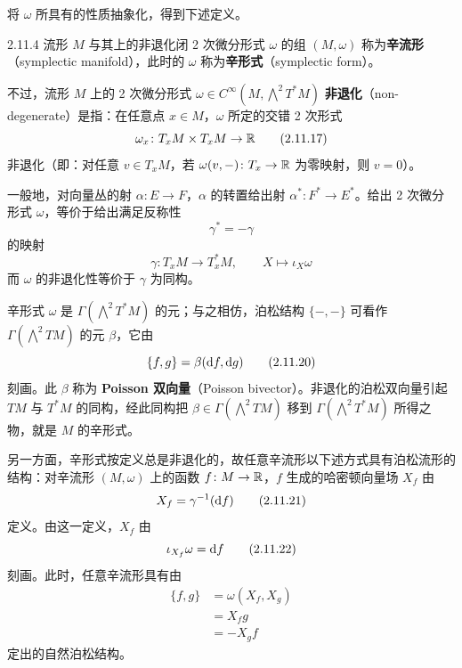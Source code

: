 
将 $\omega$ 所具有的性质抽象化，得到下述定义。

\begin{definition}{2.11.4}
流形 $M$ 与其上的非退化闭 2 次微分形式 $\omega$ 的组 $(M,\omega)$ 称为\textbf{辛流形}（symplectic manifold），此时的 $\omega$ 称为\textbf{辛形式}（symplectic form）。
\end{definition}

不过，流形 $M$ 上的 2 次微分形式 $\omega\in C^\infty(M,\bigwedge^2T^*M)$ \textbf{非退化}（non-degenerate）是指：在任意点 $x\in M$，$\omega$ 所定的交错 2 次形式
\begin{equation}
  \omega_x\colon T_xM\times T_xM\to\mathbb{R}
  \tag{2.11.17}
\end{equation}
非退化（即：对任意 $v\in T_xM$，若 $\omega(v,-)\colon T_x\to\mathbb{R}$ 为零映射，则 $v=0$）。


一般地，对向量丛的射 $\alpha\colon E\to F$，$\alpha$ 的转置给出射 $\alpha^*\colon F^*\to E^*$。给出 2 次微分形式 $\omega$，等价于给出满足反称性
\begin{equation}
  \gamma^* = -\gamma
  \tag{2.11.18}
\end{equation}
的映射
\begin{equation}
  \gamma\colon T_xM\to T_x^*M,\qquad X\mapsto\iota_X\omega
  \tag{2.11.19}
\end{equation}
而 $\omega$ 的非退化性等价于 $\gamma$ 为同构。

辛形式 $\omega$ 是 $\Gamma(\bigwedge^2T^*M)$ 的元；与之相仿，泊松结构 $\{-,-\}$ 可看作 $\Gamma(\bigwedge^2TM)$ 的元 $\beta$，它由
\begin{equation}
  \{f,g\} = \beta(\mathrm{d} f,\mathrm{d} g)
  \tag{2.11.20}
\end{equation}
刻画。此 $\beta$ 称为 \textbf{Poisson 双向量}（Poisson bivector）。非退化的泊松双向量引起 $TM$ 与 $T^*M$ 的同构，经此同构把 $\beta\in\Gamma(\bigwedge^2TM)$ 移到 $\Gamma(\bigwedge^2T^*M)$ 所得之物，就是 $M$ 的辛形式。

另一方面，辛形式按定义总是非退化的，故任意辛流形以下述方式具有泊松流形的结构：对辛流形 $(M,\omega)$ 上的函数 $f\colon M\to\mathbb{R}$，$f$ 生成的哈密顿向量场 $X_f$ 由
\begin{equation}
  X_f = \gamma^{-1}(\mathrm{d} f)
  \tag{2.11.21}
\end{equation}
定义。由这一定义，$X_f$ 由
\begin{equation}
  \iota_{X_f}\omega = \mathrm{d} f
  \tag{2.11.22}
\end{equation}
刻画。此时，任意辛流形具有由
\begin{align}
  \{f,g\} &= \omega(X_f,X_g)
  \tag{2.11.23}\\
  &= X_fg
  \tag{2.11.24}\\
  &= -X_gf
  \tag{2.11.25}
\end{align}
定出的自然泊松结构。

